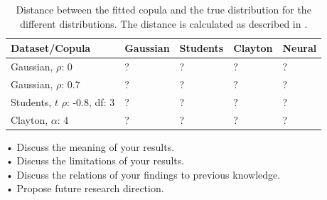 \begin{table}[h!]
    \centering
    \caption{Distance between the fitted copula and the true distribution for the different distributions. The distance is calculated as described in .}
    \begin{tabular}{lllll}
    \textbf{Dataset/Copula} & \textbf{Gaussian} & \textbf{Students} & \textbf{Clayton} & \textbf{Neural} \\
    \hline
    Gaussian, $\rho$: 0 & ? & ? & ? & ? \\
    Gaussian, $\rho$: 0.7 & ? & ? & ? & ? \\
    Students, $t$ $\rho$: -0.8, df: 3 & ? & ? & ? & ? \\
    Clayton, $\alpha$: 4 & ? & ? & ? & ? \\
    \end{tabular}
    \label{tab:DistributionDistances}
\end{table}




\begin{generalinstructions}
    • Discuss the meaning of your results.\\
    • Discuss the limitations of your results.\\
    • Discuss the relations of your findings to previous knowledge.\\
    • Propose future research direction.\\
\end{generalinstructions}


